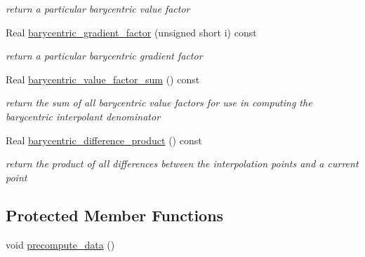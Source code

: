 \begin{DoxyCompactItemize}
\begin{DoxyCompactList}\small\item\em return a particular barycentric value factor \end{DoxyCompactList}\item 
Real \hyperlink{classPecos_1_1LagrangeInterpPolynomial_a9cd03b3dfa402dcb120423d116e07d6b}{barycentric\+\_\+gradient\+\_\+factor} (unsigned short i) const \label{classPecos_1_1LagrangeInterpPolynomial_a9cd03b3dfa402dcb120423d116e07d6b}

\begin{DoxyCompactList}\small\item\em return a particular barycentric gradient factor \end{DoxyCompactList}\item 
Real \hyperlink{classPecos_1_1LagrangeInterpPolynomial_ad36b23949c632dd0a6784f82f90050e4}{barycentric\+\_\+value\+\_\+factor\+\_\+sum} () const \label{classPecos_1_1LagrangeInterpPolynomial_ad36b23949c632dd0a6784f82f90050e4}

\begin{DoxyCompactList}\small\item\em return the sum of all barycentric value factors for use in computing the barycentric interpolant denominator \end{DoxyCompactList}\item 
Real \hyperlink{classPecos_1_1LagrangeInterpPolynomial_ae0b1d51779230f3ce9fe3d7c4fc14198}{barycentric\+\_\+difference\+\_\+product} () const \label{classPecos_1_1LagrangeInterpPolynomial_ae0b1d51779230f3ce9fe3d7c4fc14198}

\begin{DoxyCompactList}\small\item\em return the product of all differences between the interpolation points and a current point \end{DoxyCompactList}\end{DoxyCompactItemize}
\subsection*{Protected Member Functions}
\begin{DoxyCompactItemize}
\item 
void \hyperlink{classPecos_1_1LagrangeInterpPolynomial_a9a5fd3dc945d15c8423dc66dcd137b4f}{precompute\+\_\+data} ()
\end{DoxyCompactItemize}
